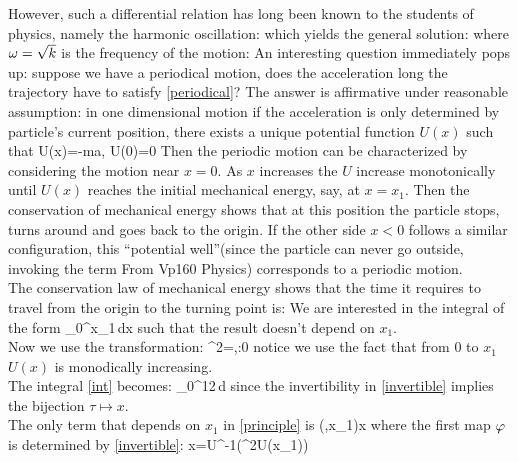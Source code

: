 However, such a differential relation has long been known to the students of physics, namely the harmonic oscillation:
which yields the general solution:
where $\omega=\sqrt{k}$ is the frequency of the motion:
An interesting question immediately pops up: suppose we have a
periodical motion, does the acceleration long the trajectory have to
satisfy \eqref{periodical}? The answer is affirmative under reasonable assumption:
in one dimensional motion if the acceleration is only determined by particle's 
current position, there exists a unique potential function $U(x)$ such that
\eq
{
U(x)=-ma\quad, U(0)=0
}
Then the periodic motion can be characterized by considering the motion near
$x=0$. As $x$ increases the $U$ increase monotonically until $U(x)$
reaches the initial mechanical energy, say, at $x=x_1$. Then the conservation of
mechanical energy shows that at this position the particle stops, turns around and
goes back to the origin. If the other side $x<0$ follows a similar configuration, this ``potential well''(since the particle can never go outside, invoking the term
From Vp160 Physics)
corresponds to a periodic motion.\\
The conservation law of mechanical energy shows that the time it
requires to travel from the origin to the turning point is:
We are interested in the integral of the form
\eq
{
\int_0^{x_1}\,dx
}
such that the result doesn't depend on $x_1$.\\
Now we use the transformation:
\eq
{
\tau^2=,\quad \tau:0
}
notice we use the fact that from $0$ to $x_1$ $U(x)$ is monodically increasing. \\
The integral \eqref{int} becomes:
\eq
{
\int_0^{1}2\,d\tau{}
}
since the invertibility in \eqref{invertible} implies the bijection $\tau\mapsto x$.\\
The only term that depends on $x_1$ in \eqref{principle} is
\eq
{
(\tau,x_1)\mapsto x\mapsto {}
}
where the first map $\varphi$ is determined by \eqref{invertible}: 
\eq
{
x=U^{-1}(\tau^2U(x_1))
}
